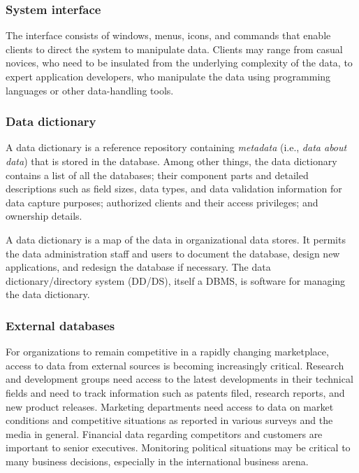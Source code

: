 \documentclass[
]{article}
\begin{document}
\hypertarget{system-interface}{%
\subsubsection*{System interface}\label{system-interface}}

The interface consists of windows, menus, icons, and commands that
enable clients to direct the system to manipulate data. Clients may
range from casual novices, who need to be insulated from the underlying
complexity of the data, to expert application developers, who manipulate
the data using programming languages or other data-handling tools.

\hypertarget{data-dictionary}{%
\subsubsection*{Data dictionary}\label{data-dictionary}}

A data dictionary is a reference repository containing \emph{metadata} (i.e.,
\emph{data about data}) that is stored in the database. Among other things,
the data dictionary contains a list of all the databases; their
component parts and detailed descriptions such as field sizes, data
types, and data validation information for data capture purposes;
authorized clients and their access privileges; and ownership details.

A data dictionary is a map of the data in organizational data stores. It
permits the data administration staff and users to document the
database, design new applications, and redesign the database if
necessary. The data dictionary/directory system (DD/DS), itself a DBMS,
is software for managing the data dictionary.

\hypertarget{external-databases}{%
\subsubsection*{External databases}\label{external-databases}}

For organizations to remain competitive in a rapidly changing
marketplace, access to data from external sources is becoming
increasingly critical. Research and development groups need access to
the latest developments in their technical fields and need to track
information such as patents filed, research reports, and new product
releases. Marketing departments need access to data on market conditions
and competitive situations as reported in various surveys and the media
in general. Financial data regarding competitors and customers are
important to senior executives. Monitoring political situations may be
critical to many business decisions, especially in the international
business arena.
\end{document}

